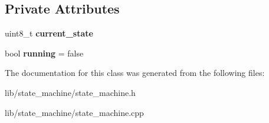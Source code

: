 \subsection*{Private Attributes}
\begin{DoxyCompactItemize}
\item 
\hypertarget{class_state_machine_abdcd9426d9a2ec9e2d703c74cd3299df}{uint8\-\_\-t {\bfseries current\-\_\-state}}\label{class_state_machine_abdcd9426d9a2ec9e2d703c74cd3299df}

\item 
\hypertarget{class_state_machine_adc6939485a12a6250df3cc65aa172d2a}{bool {\bfseries running} = false}\label{class_state_machine_adc6939485a12a6250df3cc65aa172d2a}

\end{DoxyCompactItemize}


The documentation for this class was generated from the following files\-:\begin{DoxyCompactItemize}
\item 
lib/state\-\_\-machine/state\-\_\-machine.\-h\item 
lib/state\-\_\-machine/state\-\_\-machine.\-cpp\end{DoxyCompactItemize}
